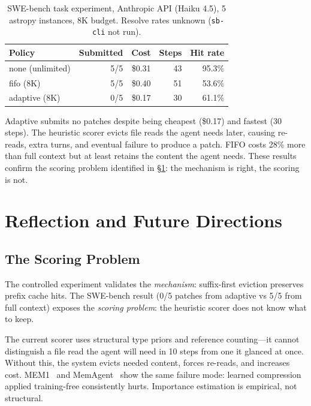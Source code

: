 \documentclass[letterpaper,twocolumn,10pt]{article}
\begin{document}
\begin{table}[h]
\centering\small
\begin{tabular}{lrrrr}
\toprule
\textbf{Policy} & \textbf{Submitted} & \textbf{Cost} & \textbf{Steps} & \textbf{Hit rate} \\
\midrule
none (unlimited) & 5/5 & \$0.31 & 43 & 95.3\% \\
fifo (8K)        & 5/5 & \$0.40 & 51 & 53.6\% \\
adaptive (8K)    & 0/5 & \$0.17 & 30 & 61.1\% \\
\bottomrule
\end{tabular}
\caption{SWE-bench task experiment, Anthropic API (Haiku 4.5), 5 astropy
instances, 8K budget. Resolve rates unknown (\texttt{sb-cli} not run).}
\label{tab:swebench}
\end{table}

Adaptive submits no patches despite being cheapest (\$0.17) and fastest
(30 steps). The heuristic scorer evicts file reads the agent needs later,
causing re-reads, extra turns, and eventual failure to produce a patch.
FIFO costs 28\% more than full context but at least retains the content
the agent needs. These results confirm the scoring problem identified in
\S\ref{sec:reflection}: the mechanism is right, the scoring is not.

\section{Reflection and Future Directions}
\label{sec:reflection}

\subsection{The Scoring Problem}

The controlled experiment validates the \emph{mechanism}: suffix-first
eviction preserves prefix cache hits. The SWE-bench result (0/5 patches from
adaptive vs 5/5 from full context) exposes the \emph{scoring problem}: the
heuristic scorer does not know what to keep.

The current scorer uses structural type priors and reference counting---it
cannot distinguish a file read the agent will need in 10 steps from one it
glanced at once. Without this, the system evicts needed content, forces
re-reads, and increases cost. MEM1~\cite{zhou2025mem1} and
MemAgent~\cite{yu2025memagent} show the same failure mode: learned
compression applied training-free consistently hurts. Importance estimation
is empirical, not structural.
\end{document}
